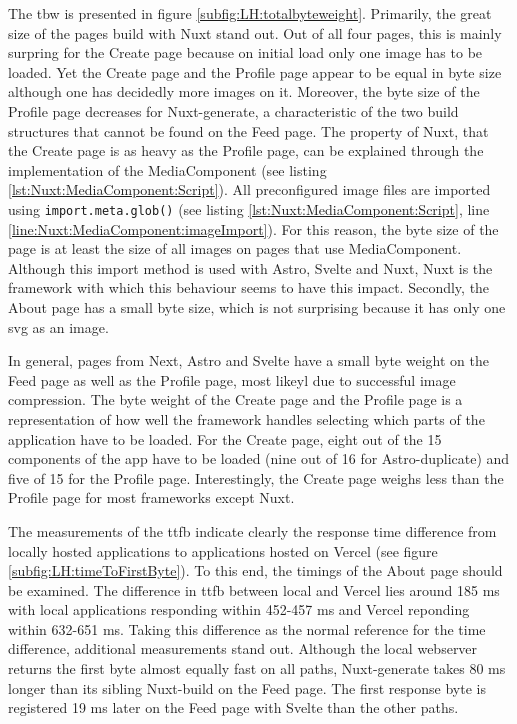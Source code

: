 \documentclass[a4paper, 12pt]{article}
\begin{document}
The \acrlong{tbw} is presented in figure \ref{subfig:LH:totalbyteweight}.
Primarily, the great size of the pages build with Nuxt stand out.
Out of all four pages, this is mainly surpring for the Create page because on initial load only one image has to be loaded.
Yet the Create page and the Profile page appear to be equal in byte size although one has decidedly more images on it.
Moreover, the byte size of the Profile page decreases for Nuxt-generate, a characteristic of the two build structures that cannot be found on the Feed page.
The property of Nuxt, that the Create page is as heavy as the Profile page, can be explained through the implementation of the MediaComponent (see listing \ref{lst:Nuxt:MediaComponent:Script}).
All preconfigured image files are imported using \lstinline{import.meta.glob()} (see listing \ref{lst:Nuxt:MediaComponent:Script}, line \ref{line:Nuxt:MediaComponent:imageImport}).
For this reason, the byte size of the page is at least the size of all images on pages that use MediaComponent.
Although this import method is used with Astro, Svelte and Nuxt, Nuxt is the framework with which this behaviour seems to have this impact.
Secondly, the About page has a small byte size, which is not surprising because it has only one \acrshort{svg} as an image.

In general, pages from Next, Astro and Svelte have a small byte weight on the Feed page as well as the Profile page, most likeyl due to successful image compression.
The byte weight of the Create page and the Profile page is a representation of how well the framework handles selecting which parts of the application have to be loaded.
For the Create page, eight out of the 15 components of the app have to be loaded (nine out of 16 for Astro-duplicate) and five of 15 for the Profile page.
Interestingly, the Create page weighs less than the Profile page for most frameworks except Nuxt.

The measurements of the \acrlong{ttfb} indicate clearly the response time difference from locally hosted applications to applications hosted on Vercel (see figure \ref{subfig:LH:timeToFirstByte}).
To this end, the timings of the About page should be examined.
The difference in \acrshort{ttfb} between local and Vercel lies around 185 ms with local applications responding within 452-457 ms and Vercel reponding within 632-651 ms.
Taking this difference as the normal reference for the time difference, additional measurements stand out.
Although the local webserver returns the first byte almost equally fast on all paths, Nuxt-generate takes 80 ms longer than its sibling Nuxt-build on the Feed page.
The first response byte is registered 19 ms later on the Feed page with Svelte than the other paths.
\end{document}
